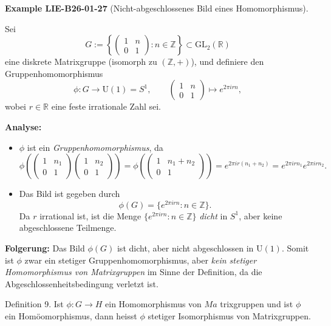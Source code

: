 \documentclass[10pt, letterpaper]{article}
\newcommand{\CustomHeading}[3]{%
  \par\medskip\noindent%
  \textbf{#1 #2} \textnormal{(#3)}.\enskip%
}
\newenvironment{EXA}[2]{\begin{unitbox}\CustomHeading{Example}{#1}{#2}}{\end{unitbox}}
\begin{document}
\begin{EXA}{LIE-B26-01-27}{Nicht-abgeschlossenes Bild eines Homomorphismus}
Sei
\[
G := 
\left\{
\begin{pmatrix}
1 & n \\[3pt]
0 & 1
\end{pmatrix}
: n \in \mathbb{Z}
\right\}
\subset \mathrm{GL}_{2}(\mathbb{R})
\]
eine diskrete Matrixgruppe (isomorph zu $(\mathbb{Z}, +)$),
und definiere den Gruppenhomomorphismus
\[
\phi : G \longrightarrow \mathrm{U}(1) = S^{1}, 
\qquad
\begin{pmatrix}
1 & n \\[3pt]
0 & 1
\end{pmatrix}
\longmapsto e^{2 \pi i r n},
\]
wobei $r \in \mathbb{R}$ eine feste irrationale Zahl sei.
\smallskip

\textbf{Analyse:}
\begin{itemize}
  \item $\phi$ ist ein \emph{Gruppenhomomorphismus}, da 
  \[
  \phi\!\left(
  \begin{pmatrix}1 & n_1 \\ 0 & 1\end{pmatrix}
  \begin{pmatrix}1 & n_2 \\ 0 & 1\end{pmatrix}
  \right)
  = \phi\!\left(
  \begin{pmatrix}1 & n_1 + n_2 \\ 0 & 1\end{pmatrix}
  \right)
  = e^{2\pi i r (n_1+n_2)}
  = e^{2\pi i r n_1} e^{2\pi i r n_2}.
  \]
  \item Das Bild ist gegeben durch
  \[
  \phi(G) = \{ e^{2\pi i r n} : n \in \mathbb{Z} \}.
  \]
  Da $r$ irrational ist, ist die Menge 
  $\{ e^{2\pi i r n} : n \in \mathbb{Z} \}$
  \emph{dicht} in $S^1$, aber keine abgeschlossene Teilmenge.
\end{itemize}

\textbf{Folgerung:}
Das Bild $\phi(G)$ ist dicht, aber nicht abgeschlossen in $\mathrm{U}(1)$.  
Somit ist $\phi$ zwar ein stetiger Gruppenhomomorphismus, aber \emph{kein stetiger Homomorphismus von Matrixgruppen} im Sinne der Definition, da die Abgeschlossenheitsbedingung verletzt ist.
\end{EXA}


Definition 9. Ist $\phi: G \rightarrow H$ ein Homomorphismus von $M a$ trixgruppen und ist $\phi$ ein Homöomorphismus, dann heisst $\phi$ stetiger Isomorphismus von Matrixgruppen.
\end{document}
